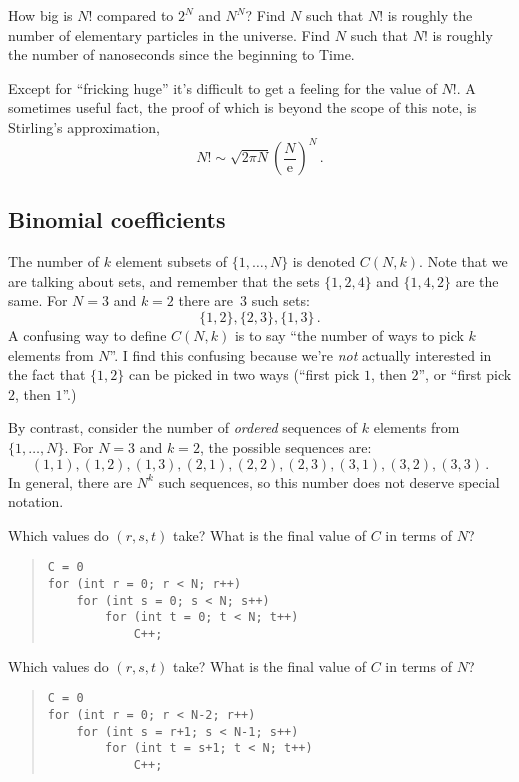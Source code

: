 \documentclass[a4paper,nobib]{tufte-handout}
\begin{document}
\begin{ExerciseList}
\Exercise How big is $N!$ compared to $2^N$ and $N^N$?
\Exercise Find $N$ such that $N!$ is roughly the number of elementary
  particles in the universe.
\Exercise Find $N$ such that $N!$ is roughly the number of nanoseconds
  since the beginning to Time.
\end{ExerciseList}

Except for ``fricking huge'' it's difficult to get a feeling for the
value of $N!$. A sometimes useful fact, the proof of which is beyond
the scope of this note, is Stirling's approximation,
\[ N! \sim \sqrt{2\pi N} {\left(\frac{N}{\mathrm e}\right)}^N\,.\]


\subsection{Binomial coefficients}

The number of $k$ element subsets of $\{1,\ldots, N\}$ is denoted
$C(N,k)$. Note that we are talking about sets, and remember that the sets
$\{1,2,4\}$ and $\{1,4,2\}$ are the same. 
For $N=3$ and $k=2$ there are~$3$ such
sets:
\[ \{1,2\}, \{2,3\}, \{1, 3\}\,.\]
A confusing
way to define
$C(N,k)$ is to say ``the number of ways to pick $k$ elements from
$N$''. I find this confusing because we're \emph{not} actually
interested in the fact that $\{1,2\}$ can be picked in two ways
(``first pick $1$, then $2$'', or ``first pick $2$, then $1$''.)

By contrast, consider the number of \emph{ordered} sequences of $k$
elements from $\{1,\ldots, N\}$. For $N=3$ and $k=2$, the possible sequences are:
\[ (1,1), (1,2), (1,3), (2,1), (2,2), (2,3),(3,1), (3,2), (3,3)\,.\]
In general, there are $N^k$ such sequences, so this number does not
deserve special notation.

\begin{ExerciseList}
\Exercise  Which values do $(r,s,t)$ take? What is the final value of
$C$ in terms of $N$?
\begin{quote}
\begin{lstlisting}[basicstyle=\ttfamily\small]
C = 0
for (int r = 0; r < N; r++)
    for (int s = 0; s < N; s++)
        for (int t = 0; t < N; t++)
            C++;
\end{lstlisting}
\end{quote}
\Exercise Which values do $(r,s,t)$ take? What is the final value of
$C$ in terms of $N$?
\begin{quote}
\begin{lstlisting}[basicstyle=\ttfamily\small]
C = 0
for (int r = 0; r < N-2; r++)
    for (int s = r+1; s < N-1; s++)
        for (int t = s+1; t < N; t++)
            C++;
\end{lstlisting}
\end{quote}
\end{ExerciseList}
\end{document}
